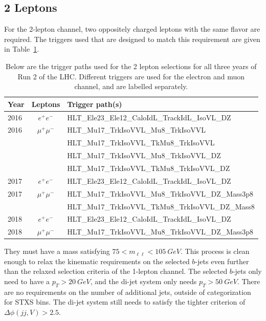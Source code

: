 \subsection{2 Leptons} \label{sec:resolved-2}

For the 2-lepton channel, two oppositely charged leptons with the same flavor are required.
The triggers used that are designed to match this requirement are given
in Table~\ref{tab:2-triggers}.
\begin{table}
  \centering
  \caption[Triggers for the 2 lepton selections]{
    Below are the trigger paths used for the 2 lepton selections
    for all three years of Run 2 of the LHC.
    Different triggers are used for the electron and muon channel,
    and are labelled separately.
  }
  \begin{tabular}{|l|c|l|}
    \hline
    Year & Leptons & Trigger path(s) \\
    \hline
    2016 & $e^+e^-$ & HLT\_Ele23\_Ele12\_CaloIdL\_TrackIdL\_IsoVL\_DZ \\
    \hline
    2016 & $\mu^+\mu^-$ & HLT\_Mu17\_TrkIsoVVL\_Mu8\_TrkIsoVVL \\
    & & HLT\_Mu17\_TrkIsoVVL\_TkMu8\_TrkIsoVVL \\
    & & HLT\_Mu17\_TrkIsoVVL\_Mu8\_TrkIsoVVL\_DZ \\
    & & HLT\_Mu17\_TrkIsoVVL\_TkMu8\_TrkIsoVVL\_DZ \\
    \hline
    2017 & $e^+e^-$ & HLT\_Ele23\_Ele12\_CaloIdL\_TrackIdL\_IsoVL\_DZ \\
    \hline
    2017 & $\mu^+\mu^-$ & HLT\_Mu17\_TrkIsoVVL\_Mu8\_TrkIsoVVL\_DZ\_Mass3p8 \\
    & & HLT\_Mu17\_TrkIsoVVL\_TkMu8\_TrkIsoVVL\_DZ\_Mass8 \\
    \hline
    2018 & $e^+e^-$ & HLT\_Ele23\_Ele12\_CaloIdL\_TrackIdL\_IsoVL\_DZ \\
    \hline
    2018 & $\mu^+\mu^-$ & HLT\_Mu17\_TrkIsoVVL\_Mu8\_TrkIsoVVL\_DZ\_Mass3p8 \\
    \hline
  \end{tabular}
  \label{tab:2-triggers}
\end{table}
They must have a mass satisfying $75 < m_{\ell\ell} < \SI{105}{GeV}$.
This process is clean enough to relax the kinematic requirements on the selected $b$-jets
even further than the relaxed selection criteria of the 1-lepton channel.
The selected $b$-jets only need to have a $p_T > \SI{20}{GeV}$,
and the di-jet system only needs $p_T > \SI{50}{GeV}$.
There are no requirements on the number of additional jets, outside of categorization for STXS bins.
The di-jet system still needs to satisfy the tighter criterion of $\Delta\phi(jj,V) > 2.5$.

